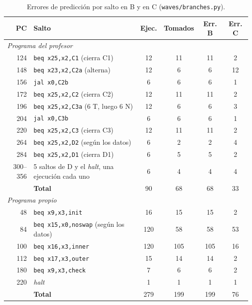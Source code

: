 \documentclass[12pt,a4paper]{article}
\begin{document}
\begin{table}[H]
\centering
\small
\setlength{\tabcolsep}{4pt}
\begin{tabular}{rlcccc}
\toprule
\textbf{PC} & \textbf{Salto} & \textbf{Ejec.} & \textbf{Tomados} & \textbf{Err. B} & \textbf{Err. C} \\
\midrule
\multicolumn{6}{l}{\textit{Programa del profesor}} \\
124 & \texttt{beq x25,x2,C1} (cierra C1)       & 12 & 11 & 11 & 2 \\
148 & \texttt{beq x23,x2,C2a} (alterna)        & 12 & 6  & 6  & 12 \\
156 & \texttt{jal x0,C2b}                      & 6  & 6  & 6  & 1 \\
172 & \texttt{beq x25,x2,C2} (cierra C2)       & 12 & 11 & 11 & 2 \\
196 & \texttt{beq x25,x2,C3a} (6 T, luego 6 N) & 12 & 6  & 6  & 3 \\
204 & \texttt{jal x0,C3b}                      & 6  & 6  & 6  & 1 \\
220 & \texttt{beq x25,x2,C3} (cierra C3)       & 12 & 11 & 11 & 2 \\
264 & \texttt{beq x25,x2,D2} (según los datos) & 6  & 2  & 2  & 4 \\
284 & \texttt{beq x25,x2,D1} (cierra D1)       & 6  & 5  & 5  & 2 \\
300--356 & 5 saltos de D y el \textit{halt}, una ejecución cada uno & 6 & 4 & 4 & 4 \\
    & \textbf{Total}                           & 90 & 68 & 68 & 33 \\
\midrule
\multicolumn{6}{l}{\textit{Programa propio}} \\
48  & \texttt{beq x9,x3,init}                  & 16  & 15  & 15  & 2 \\
84  & \texttt{beq x15,x0,noswap} (según los datos) & 120 & 58 & 58 & 53 \\
100 & \texttt{beq x16,x3,inner}                & 120 & 105 & 105 & 16 \\
112 & \texttt{beq x17,x3,outer}                & 15  & 14  & 14  & 2 \\
180 & \texttt{beq x9,x3,check}                 & 7   & 6   & 6   & 2 \\
220 & \textit{halt}                             & 1   & 1   & 1   & 1 \\
    & \textbf{Total}                           & 279 & 199 & 199 & 76 \\
\bottomrule
\end{tabular}
\caption{Errores de predicción por salto en B y en C (\texttt{waves/branches.py}).}
\label{tab:saltos}
\end{table}
\end{document}
